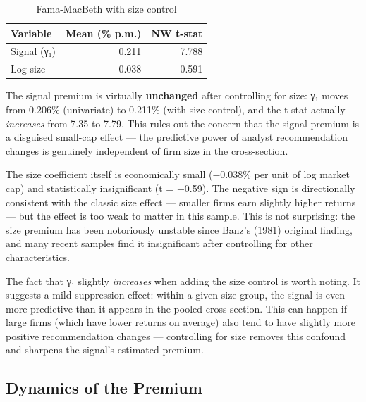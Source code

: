 \documentclass[
  letterpaper,
  DIV=11,
  numbers=noendperiod]{scrartcl}
\begin{document}
\begin{longtable}[t]{lrr}
\caption{\label{tab:fm-with-size}Fama-MacBeth with size control}\\
\toprule
Variable & Mean (\% p.m.) & NW t-stat\\
\midrule
Signal (γ₁) & 0.211 & 7.788\\
Log size & -0.038 & -0.591\\
\bottomrule
\end{longtable}

The signal premium is virtually \textbf{unchanged} after controlling for
size: γ₁ moves from 0.206\% (univariate) to 0.211\% (with size control),
and the t-stat actually \emph{increases} from 7.35 to 7.79. This rules
out the concern that the signal premium is a disguised small-cap effect
--- the predictive power of analyst recommendation changes is genuinely
independent of firm size in the cross-section.

The size coefficient itself is economically small (−0.038\% per unit of
log market cap) and statistically insignificant (t = −0.59). The
negative sign is directionally consistent with the classic size effect
--- smaller firms earn slightly higher returns --- but the effect is too
weak to matter in this sample. This is not surprising: the size premium
has been notoriously unstable since Banz's (1981) original finding, and
many recent samples find it insignificant after controlling for other
characteristics.

The fact that γ₁ slightly \emph{increases} when adding the size control
is worth noting. It suggests a mild suppression effect: within a given
size group, the signal is even more predictive than it appears in the
pooled cross-section. This can happen if large firms (which have lower
returns on average) also tend to have slightly more positive
recommendation changes --- controlling for size removes this confound
and sharpens the signal's estimated premium.

\subsection{Dynamics of the Premium}\label{dynamics-of-the-premium}
\end{document}
